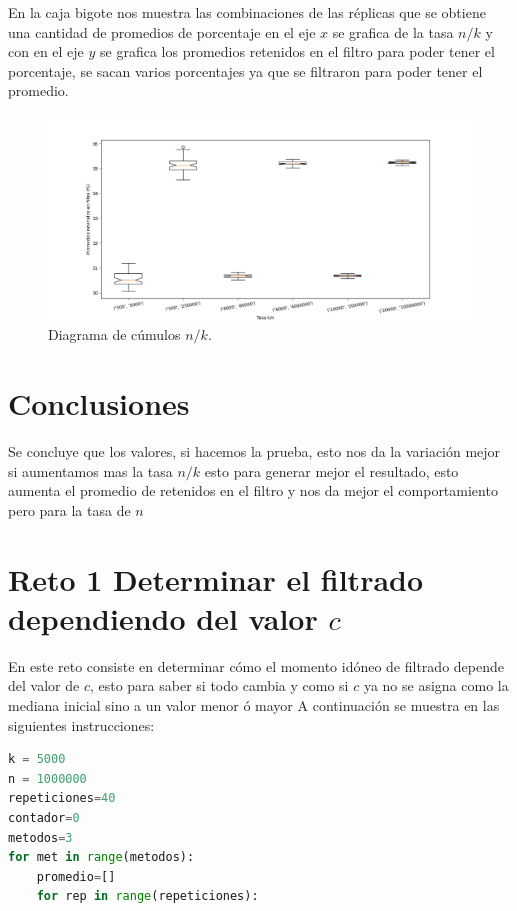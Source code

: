 \documentclass{article}
\begin{document}
En la caja bigote nos muestra las combinaciones de las réplicas que se obtiene una cantidad de promedios de porcentaje en el eje $x$ se grafica de la tasa $n/k$ y con en el eje $y$ se grafica los promedios retenidos en el filtro para poder tener el porcentaje, se sacan varios porcentajes ya que se filtraron para poder tener el promedio.

\newpage
\begin{figure}
    \centering
    \includegraphics[width=210mm]{Figure_1.png}
    \caption{Diagrama de cúmulos $n/k$.}
    \label{figure}
\end{figure}


\section{Conclusiones}\label{}
Se concluye que los valores, si hacemos la prueba, esto nos da la variación mejor si aumentamos mas la tasa $n/k$ esto para generar mejor el resultado, esto aumenta el promedio de retenidos en el filtro y nos da mejor el comportamiento pero para la tasa de $n$


\newpage
\section{Reto 1 Determinar el filtrado dependiendo del valor $c$}\label{}
En este reto consiste en determinar cómo el momento idóneo de filtrado depende del valor de $c$, esto para saber si todo cambia y como si $c$ ya no se asigna como la mediana inicial sino a un valor menor ó mayor A continuación se muestra en las siguientes instrucciones: 

\begin{lstlisting}[caption=Variación de $c$ en tres diferentes métodos, language=Python]
k = 5000
n = 1000000
repeticiones=40
contador=0
metodos=3 
for met in range(metodos):
    promedio=[]
    for rep in range(repeticiones):
\end{lstlisting}
\end{document}

